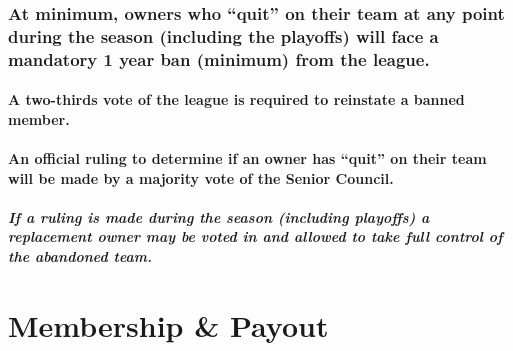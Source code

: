 \documentclass[
]{book}
\begin{document}
\hypertarget{at-minimum-owners-who-quit-on-their-team-at-any-point-during-the-season-including-the-playoffs-will-face-a-mandatory-1-year-ban-minimum-from-the-league.}{%
\subsection{At minimum, owners who ``quit'' on their team at any point during the season (including the playoffs) will face a mandatory 1 year ban (minimum) from the league.}\label{at-minimum-owners-who-quit-on-their-team-at-any-point-during-the-season-including-the-playoffs-will-face-a-mandatory-1-year-ban-minimum-from-the-league.}}

\hypertarget{a-two-thirds-vote-of-the-league-is-required-to-reinstate-a-banned-member.}{%
\subsubsection{A two-thirds vote of the league is required to reinstate a banned member.}\label{a-two-thirds-vote-of-the-league-is-required-to-reinstate-a-banned-member.}}

\hypertarget{an-official-ruling-to-determine-if-an-owner-has-quit-on-their-team-will-be-made-by-a-majority-vote-of-the-senior-council.}{%
\subsubsection{An official ruling to determine if an owner has ``quit'' on their team will be made by a majority vote of the Senior Council.}\label{an-official-ruling-to-determine-if-an-owner-has-quit-on-their-team-will-be-made-by-a-majority-vote-of-the-senior-council.}}

\hypertarget{if-a-ruling-is-made-during-the-season-including-playoffs-a-replacement-owner-may-be-voted-in-and-allowed-to-take-full-control-of-the-abandoned-team.}{%
\paragraph{If a ruling is made during the season (including playoffs) a replacement owner may be voted in and allowed to take full control of the abandoned team.}\label{if-a-ruling-is-made-during-the-season-including-playoffs-a-replacement-owner-may-be-voted-in-and-allowed-to-take-full-control-of-the-abandoned-team.}}

\hypertarget{membership-payout}{%
\chapter{Membership \& Payout}\label{membership-payout}}
\end{document}
